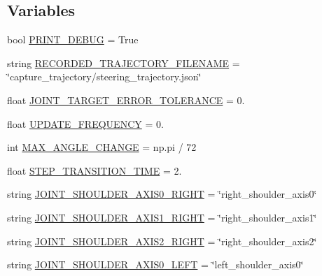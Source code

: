 \subsection*{Variables}
\begin{DoxyCompactItemize}
\item 
bool \mbox{\hyperlink{namespacesteering__simulation_a13db823567e2a46183a6887d72165d65}{P\+R\+I\+N\+T\+\_\+\+D\+E\+B\+UG}} = True
\item 
string \mbox{\hyperlink{namespacesteering__simulation_ab4de54bdf1b917546004a6eb92a8cd27}{R\+E\+C\+O\+R\+D\+E\+D\+\_\+\+T\+R\+A\+J\+E\+C\+T\+O\+R\+Y\+\_\+\+F\+I\+L\+E\+N\+A\+ME}} = \char`\"{}capture\+\_\+trajectory/steering\+\_\+trajectory.\+json\char`\"{}
\item 
float \mbox{\hyperlink{namespacesteering__simulation_a9d7ce571547e355ac4b1794548af1682}{J\+O\+I\+N\+T\+\_\+\+T\+A\+R\+G\+E\+T\+\_\+\+E\+R\+R\+O\+R\+\_\+\+T\+O\+L\+E\+R\+A\+N\+CE}} = 0.
\item 
float \mbox{\hyperlink{namespacesteering__simulation_aa98f000080f13c942c2287914f8ef406}{U\+P\+D\+A\+T\+E\+\_\+\+F\+R\+E\+Q\+U\+E\+N\+CY}} = 0.
\item 
int \mbox{\hyperlink{namespacesteering__simulation_af6a6a70049e66b65e195d32a0e566f39}{M\+A\+X\+\_\+\+A\+N\+G\+L\+E\+\_\+\+C\+H\+A\+N\+GE}} = np.\+pi / 72
\item 
float \mbox{\hyperlink{namespacesteering__simulation_a4f4712994f92a7c212a9fc29f90efafd}{S\+T\+E\+P\+\_\+\+T\+R\+A\+N\+S\+I\+T\+I\+O\+N\+\_\+\+T\+I\+ME}} = 2.
\item 
string \mbox{\hyperlink{namespacesteering__simulation_aa17ebfc23242a5eb70e77d1c7b838b41}{J\+O\+I\+N\+T\+\_\+\+S\+H\+O\+U\+L\+D\+E\+R\+\_\+\+A\+X\+I\+S0\+\_\+\+R\+I\+G\+HT}} = \char`\"{}right\+\_\+shoulder\+\_\+axis0\char`\"{}
\item 
string \mbox{\hyperlink{namespacesteering__simulation_a30fbab19241dfbe329ee608a9c47a31b}{J\+O\+I\+N\+T\+\_\+\+S\+H\+O\+U\+L\+D\+E\+R\+\_\+\+A\+X\+I\+S1\+\_\+\+R\+I\+G\+HT}} = \char`\"{}right\+\_\+shoulder\+\_\+axis1\char`\"{}
\item 
string \mbox{\hyperlink{namespacesteering__simulation_a11b82fa8fdda843272cc39e43abc48e5}{J\+O\+I\+N\+T\+\_\+\+S\+H\+O\+U\+L\+D\+E\+R\+\_\+\+A\+X\+I\+S2\+\_\+\+R\+I\+G\+HT}} = \char`\"{}right\+\_\+shoulder\+\_\+axis2\char`\"{}
\item 
string \mbox{\hyperlink{namespacesteering__simulation_a349c0f63ddcdf619cf509dceff5f53a6}{J\+O\+I\+N\+T\+\_\+\+S\+H\+O\+U\+L\+D\+E\+R\+\_\+\+A\+X\+I\+S0\+\_\+\+L\+E\+FT}} = \char`\"{}left\+\_\+shoulder\+\_\+axis0\char`\"{}

\end{DoxyCompactItemize}
